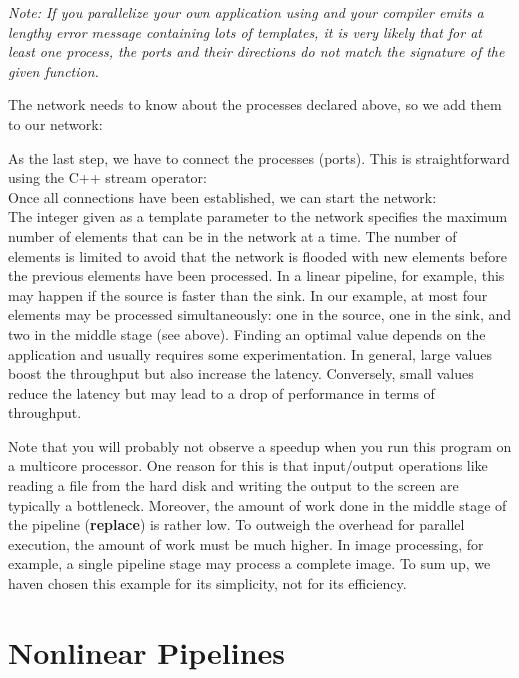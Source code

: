 \emph{Note: If you parallelize your own application using \embb and your compiler emits a lengthy error message containing lots of templates, it is very likely that for at least one process, the ports and their directions do not match the signature of the given function.}

The network needs to know about the processes declared above, so we add them to our network:
%
\\
%

As the last step, we have to connect the processes (ports). This is straightforward using the C++ stream operator:
%
\\
%
Once all connections have been established, we can start the network:
%
\\
%
The integer given as a template parameter to the network specifies the maximum number of elements that can be in the network at a time. The number of elements is limited to avoid that the network is flooded with new elements before the previous elements have been processed. In a linear pipeline, for example, this may happen if the source is faster than the sink. In our example, at most four elements may be processed simultaneously: one in the source, one in the sink, and two in the middle stage (see above). Finding an optimal value depends on the application and usually requires some experimentation. In general, large values boost the throughput but also increase the latency. Conversely, small values reduce the latency but may lead to a drop of performance in terms of throughput.

Note that you will probably not observe a speedup when you run this program on a multicore processor. One reason for this is that input$/$output operations like reading a file from the hard disk and writing the output to the screen are typically a bottleneck. Moreover, the amount of work done in the middle stage of the pipeline (\textbf{replace}) is rather low. To outweigh the overhead for parallel execution, the amount of work must be much higher. In image processing, for example, a single pipeline stage may process a complete image. To sum up, we haven chosen this example for its simplicity, not for its efficiency.

\section{Nonlinear Pipelines}

